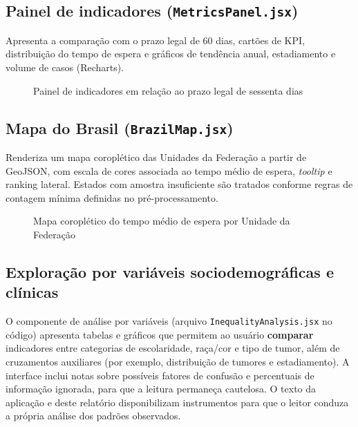 \subsection{Painel de indicadores (\texttt{MetricsPanel.jsx})}

Apresenta a comparação com o prazo legal de 60 dias, cartões de \acs{KPI}, distribuição do tempo de espera e gráficos de tendência anual, estadiamento e volume de casos (Recharts).

\begin{figure}[H]
\centering
\caption{Painel de indicadores em relação ao prazo legal de sessenta dias}
\label{fig:metrics}
\end{figure}

\subsection{Mapa do Brasil (\texttt{BrazilMap.jsx})}

Renderiza um mapa coroplético das Unidades da Federação a partir de GeoJSON, com escala de cores associada ao tempo médio de espera, \textit{tooltip} e ranking lateral. Estados com amostra insuficiente são tratados conforme regras de contagem mínima definidas no pré-processamento.

\begin{figure}[H]
\centering
\caption{Mapa coroplético do tempo médio de espera por Unidade da Federação}
\label{fig:mapa}
\end{figure}

\subsection{Exploração por variáveis sociodemográficas e clínicas}

O componente de análise por variáveis (arquivo \texttt{InequalityAnalysis.jsx} no código) apresenta tabelas e gráficos que permitem ao usuário \textbf{comparar} indicadores entre categorias de escolaridade, raça/cor e tipo de tumor, além de cruzamentos auxiliares (por exemplo, distribuição de tumores e estadiamento). A interface inclui notas sobre possíveis fatores de confusão e percentuais de informação ignorada, para que a leitura permaneça cautelosa. O texto da aplicação e deste relatório disponibilizam instrumentos para que o leitor conduza a própria análise dos padrões observados.

